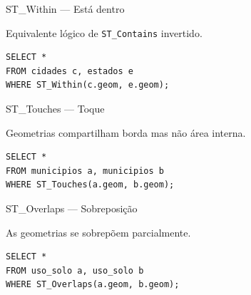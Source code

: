 \documentclass{beamer}
\begin{document}
\begin{frame}[fragile]{ST\_Within — Está dentro}
    
    Equivalente lógico de \texttt{ST\_Contains} invertido.
    
    \begin{verbatim}
SELECT *
FROM cidades c, estados e
WHERE ST_Within(c.geom, e.geom);
    \end{verbatim}
    
    \begin{center}
    \end{center}
    
\end{frame}

\begin{frame}[fragile]{ST\_Touches — Toque}
    
    Geometrias compartilham borda mas não área interna.
    
    \begin{verbatim}
SELECT *
FROM municipios a, municipios b
WHERE ST_Touches(a.geom, b.geom);
    \end{verbatim}
    
    \begin{center}
    \end{center}
    
\end{frame}

\begin{frame}[fragile]{ST\_Overlaps — Sobreposição}
    
    As geometrias se sobrepõem parcialmente.
    
    \begin{verbatim}
SELECT *
FROM uso_solo a, uso_solo b
WHERE ST_Overlaps(a.geom, b.geom);
    \end{verbatim}
    
    \begin{center}
    \end{center}
    
\end{frame}
\end{document}
